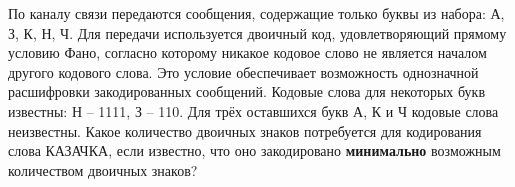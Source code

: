 \documentclass[14pt,a4paper]{article}
\begin{document}
По каналу связи передаются сообщения, содержащие только буквы из
набора: А, З, К, Н, Ч. Для передачи используется двоичный код,
удовлетворяющий прямому условию Фано, согласно которому никакое
кодовое слово не является началом другого кодового слова. Это условие
обеспечивает возможность однозначной расшифровки закодированных
сообщений. Кодовые слова для некоторых букв известны: Н – 1111, З –
110. Для трёх оставшихся букв А, К и Ч кодовые слова неизвестны.
Какое количество двоичных знаков потребуется для кодирования слова
КАЗАЧКА, если известно, что оно закодировано \textbf{минимально}
возможным количеством двоичных знаков?
\end{document}
